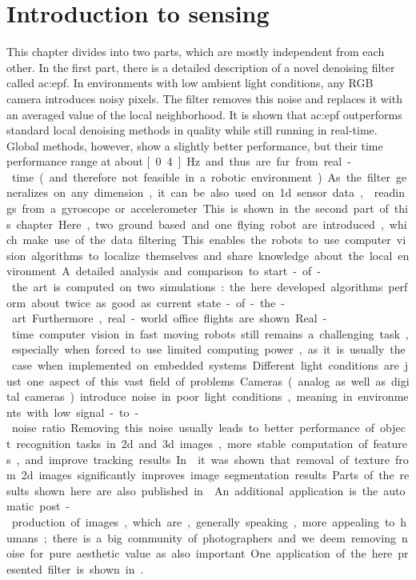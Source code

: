 \section{Introduction to sensing}

This chapter divides into two parts, which are mostly independent from each other.
In the first part, there is a detailed description of a novel denoising filter called \gls{ac:epf}.
In environments with low ambient light conditions, any RGB camera introduces noisy pixels.
The filter removes this noise and replaces it with an averaged value of the local neighborhood.
It is shown that \gls{ac:epf} outperforms standard local denoising methods in quality while still running in real-time.
Global methods, however, show a slightly better performance, but their time performance range at about \unit[0.4]{Hz} and thus are far from real-time (and therefore not feasible in a robotic environment).
As the filter generalizes on any dimension, it can be also used on 1d sensor data, \eg readings from a gyroscope or accelerometer.

This is shown in the second part of this chapter.
Here, two ground based and one flying robot are introduced, which make use of the data filtering.
This enables the robots to use computer vision algorithms to localize themselves and share knowledge about the local environment.
A detailed analysis and comparison to start-of-the art is computed on two simulations: the here developed algorithms perform about twice as good as current state-of-the-art.
Furthermore, real-world office flights are shown.

Real-time computer vision in fast moving robots still remains a challenging task, especially when forced to use limited computing power, as it is usually the case when implemented on embedded systems. 
Different light conditions are just one aspect of this vast field of problems.
Cameras (analog as well as digital cameras) introduce noise in poor light conditions, meaning in environments with low signal-to-noise ratio.
Removing this noise usually leads to better performance of object recognition tasks in 2d and 3d images, more stable computation of features, and improve tracking results.
In~\textcite{reichabramovpapon2013} it was shown  that removal of texture from 2d images significantly improves image segmentation results.
Parts of the results shown here are also published in~\textcite{reichwoergoetterdellen2018}.

An additional application is the automatic post-production of images, which are, generally speaking, more appealing to humans; there is a big community of photographers and we deem removing noise for pure aesthetic value as also important.
One application of the here presented filter is shown in .

